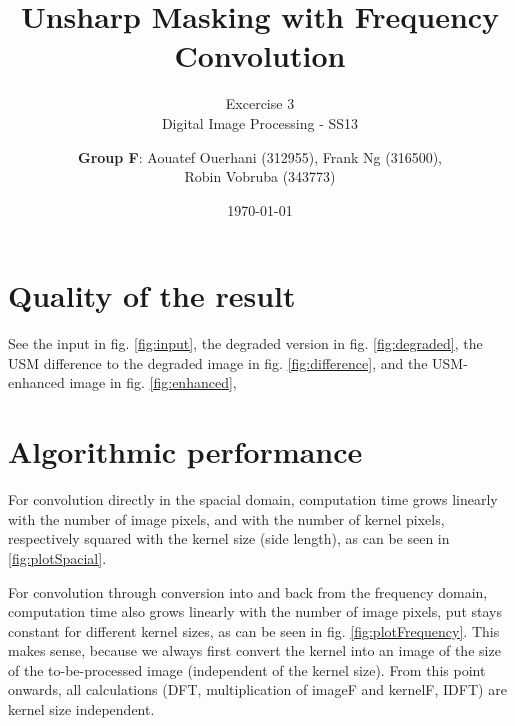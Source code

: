 \documentclass[a4paper,headings=small]{scrartcl}
\title{ Unsharp Masking with Frequency Convolution}
\subtitle{Excercise 3 \\ Digital Image Processing - SS13}
\author{\textbf{Group F}: Aouatef Ouerhani (312955), Frank Ng (316500),\\ Robin Vobruba (343773)}
\date{\today}
\numberwithin{equation}{section} %
\numberwithin{figure}{section}   %
\newcommand{\imgGeneratedRoot}{../../../target}
\begin{document}
\maketitle


\section{Quality of the result}

See the input in fig. \ref{fig:input},
the degraded version in fig. \ref{fig:degraded},
the USM difference to the degraded image in fig. \ref{fig:difference},
and the USM-enhanced image in fig. \ref{fig:enhanced},


\begin{figure}[ht]
	\centering



	\label{fig:imagesQuality}
\end{figure}


\section{Algorithmic performance}

For convolution directly in the spacial domain,
computation time grows linearly with the number of image pixels,
and with the number of kernel pixels,
respectively squared with the kernel size (side length),
as can be seen in \ref{fig:plotSpacial}.

For convolution through conversion into and back from the frequency domain,
computation time also grows linearly with the number of image pixels,
put stays constant for different kernel sizes,
as can be seen in fig. \ref{fig:plotFrequency}.
This makes sense, because we always first convert the kernel into an image
of the size of the to-be-processed image (independent of the kernel size).
From this point onwards, all calculations
(DFT, multiplication of imageF and kernelF, IDFT)
are kernel size independent.
\end{document}
